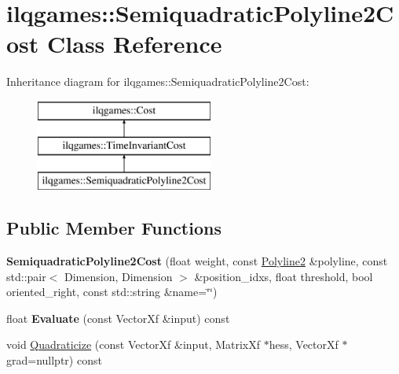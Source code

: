 \hypertarget{classilqgames_1_1_semiquadratic_polyline2_cost}{}\section{ilqgames\+:\+:Semiquadratic\+Polyline2\+Cost Class Reference}
\label{classilqgames_1_1_semiquadratic_polyline2_cost}
Inheritance diagram for ilqgames\+:\+:Semiquadratic\+Polyline2\+Cost\+:\begin{figure}[H]
\begin{center}
\leavevmode
\includegraphics[height=3.000000cm]{classilqgames_1_1_semiquadratic_polyline2_cost}
\end{center}
\end{figure}
\subsection*{Public Member Functions}
\begin{DoxyCompactItemize}
\item 
{\bfseries Semiquadratic\+Polyline2\+Cost} (float weight, const \hyperlink{classilqgames_1_1_polyline2}{Polyline2} \&polyline, const std\+::pair$<$ Dimension, Dimension $>$ \&position\+\_\+idxs, float threshold, bool oriented\+\_\+right, const std\+::string \&name=\char`\"{}\char`\"{})\hypertarget{classilqgames_1_1_semiquadratic_polyline2_cost_a7e928410aef0e930024890fb519b1290}{}\label{classilqgames_1_1_semiquadratic_polyline2_cost_a7e928410aef0e930024890fb519b1290}

\item 
float {\bfseries Evaluate} (const Vector\+Xf \&input) const \hypertarget{classilqgames_1_1_semiquadratic_polyline2_cost_abe1063a923c02e53e3512b4de85539b8}{}\label{classilqgames_1_1_semiquadratic_polyline2_cost_abe1063a923c02e53e3512b4de85539b8}

\item 
void \hyperlink{classilqgames_1_1_semiquadratic_polyline2_cost_aa50a16b3417909909e0793708090ac89}{Quadraticize} (const Vector\+Xf \&input, Matrix\+Xf $\ast$hess, Vector\+Xf $\ast$grad=nullptr) const 
\end{DoxyCompactItemize}
